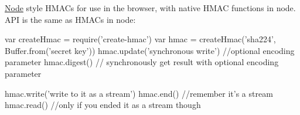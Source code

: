 \href{https://www.npmjs.org/package/create-hmac}{\tt } \href{https://travis-ci.org/crypto-browserify/createHmac}{\tt } \href{https://david-dm.org/crypto-browserify/createHmac#info=dependencies}{\tt }

\href{https://github.com/feross/standard}{\tt }

\mbox{\hyperlink{classNode}{Node}} style H\+M\+A\+Cs for use in the browser, with native H\+M\+AC functions in node. A\+PI is the same as H\+M\+A\+Cs in node\+:


\begin{DoxyCode}
var createHmac = require('create-hmac')
var hmac = createHmac('sha224', Buffer.from('secret key'))
hmac.update('synchronous write') //optional encoding parameter
hmac.digest() // synchronously get result with optional encoding parameter

hmac.write('write to it as a stream')
hmac.end() //remember it's a stream
hmac.read() //only if you ended it as a stream though
\end{DoxyCode}
 